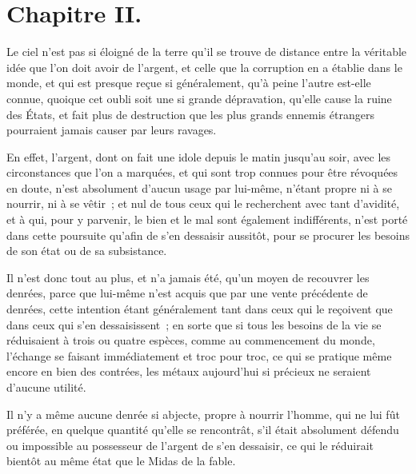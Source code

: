 \documentclass[french,twoside]{book} %
\begin{document}
\section[{Chapitre II.}]{Chapitre II.}
\noindent Le ciel n’est pas si éloigné de la terre qu’il se trouve de distance entre la véritable idée que l’on doit avoir de l’argent, et celle que la corruption en a établie dans le monde, et qui est presque reçue si généralement, qu’à peine l’autre est-elle connue, quoique cet oubli soit une si grande dépravation, qu’elle cause la ruine des États, et fait plus de destruction que les plus grands ennemis étrangers pourraient jamais causer par leurs ravages.\par
En effet, l’argent, dont on fait une idole depuis le matin jusqu’au soir, avec les circonstances que l’on a marquées, et qui sont trop connues pour être révoquées en doute, n’est absolument d’aucun usage par lui-même, n’étant propre ni à se nourrir, ni à se vêtir ; et nul de tous ceux qui le recherchent avec tant d’avidité, et à qui, pour y parvenir, le bien et le mal sont également indifférents, n’est porté dans cette poursuite qu’afin de s’en dessaisir aussitôt, pour se procurer les besoins de son état ou de sa subsistance.\par
Il n’est donc tout au plus, et n’a jamais été, qu’un moyen de recouvrer les denrées, parce que lui-même n’est acquis que par une vente précédente de denrées, cette intention étant généralement tant dans ceux qui le reçoivent que dans ceux qui s’en dessaisissent ; en sorte que si tous les besoins de la vie se réduisaient à trois ou quatre espèces, comme au commencement du monde, l’échange se faisant immédiatement et troc pour troc, ce qui se pratique même encore en bien des contrées, les métaux aujourd’hui si précieux ne seraient d’aucune utilité.\par
Il n’y a même aucune denrée si abjecte, propre à nourrir l’homme, qui ne lui fût préférée, en quelque quantité qu’elle se rencontrât, s’il était absolument défendu ou impossible au possesseur de l’argent de s’en dessaisir, ce qui le réduirait bientôt au même état que le Midas de la fable.\par
\end{document}
